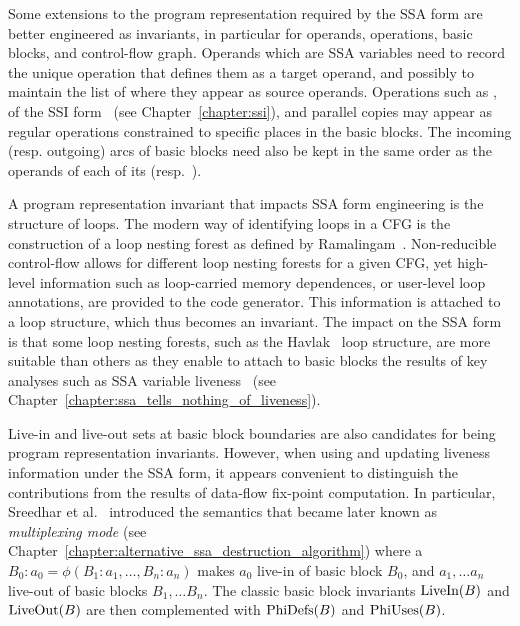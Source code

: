 Some extensions to the program representation required by the SSA form are
better engineered as invariants, in particular for operands, operations, basic
blocks, and control-flow graph.  Operands which are SSA variables need to record
the unique operation that defines them as a target operand, and possibly to
maintain the list of where they appear as source operands. Operations such as
\phifuns{}, \sigmafuns\index{\sigmafun} of the SSI form~\cite{Boissinot:2011:APLAS} (see Chapter~\ref{chapter:ssi}), and
parallel copies may appear as regular operations constrained to specific places
in the basic blocks. The incoming (resp. outgoing) arcs of basic blocks need also be kept in the
same order as the operands of each of its \phifuns (resp.~\sigmafuns).

A program representation invariant that impacts SSA form engineering is the
structure of loops. The modern way of identifying loops in a CFG is the
construction of a loop nesting forest as defined by Ramalingam~\cite{Ramalingam:2002:TOPLAS}. Non-reducible control-flow allows for different
loop nesting forests for a given CFG, yet high-level information such as
loop-carried memory dependences, or user-level loop annotations, are provided to
the code generator. This information is attached to a loop structure, which thus
becomes an invariant. The impact on the SSA form is that some loop nesting
forests, such as the Havlak~\cite{Havlak:1997:TOPLAS} loop structure, are more suitable than
others as they enable to attach to basic blocks the results of key analyses
such as SSA variable liveness~\cite{Boissinot:2011:APLAS} (see Chapter~\ref{chapter:ssa_tells_nothing_of_liveness}).

Live-in and live-out sets at basic block boundaries are also
candidates for being program representation invariants. However, when using and
updating liveness information under the SSA form, it appears convenient to
distinguish the \phifun contributions from the results of data-flow
fix-point computation.  In particular, Sreedhar et al.~\cite{Sreedhar:1999:SAS}
introduced the \phifun semantics that became later known as
\emph{multiplexing mode} (see Chapter~\ref{chapter:alternative_ssa_destruction_algorithm})
where a \phifun $B_0:a_0=\phi(B_1:a_1,\dots,B_n:a_n)$ makes $a_0$ live-in of
basic block $B_0$, and $a_1,\dots a_n$ live-out of basic blocks $B_1,\dots B_n$.
The classic basic block invariants $\hbox{LiveIn}(B)$ and $\hbox{LiveOut}(B)$
are then complemented with $\hbox{PhiDefs}(B)$ and $\hbox{PhiUses}(B)$.


